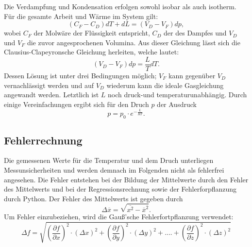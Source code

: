 Die Verdampfung und Kondensation erfolgen sowohl isobar als auch isotherm.
Für die gesamte Arbeit und Wärme im System gilt:
\begin{equation}
    (C_F-C_D)dT + dL = (V_D-V_F)dp,
\end{equation}
wobei $C_F$ der Molwäre der Flüssigkeit entspricht, $C_D$ der des Dampfes und 
$V_D$ und $V_F$ die zuvor angesprochenen Volumina. Aus dieser Gleichung lässt 
sich die Clausius-Clapeyronsche Gleichung herleiten, welche lautet:
\begin{equation}
    \label{eqn:2}
    (V_D-V_F)dp = \frac{L}{T}dT.
\end{equation}
Dessen Lösung ist unter drei Bedingungen möglich; $V_F$ kann gegenüber $V_D$
vernachlässigt werden und auf $V_D$ wiederum kann die ideale Gasgleichung
angewandt werden. Letztlich ist $L$ noch druck-und temperaturunabhängig.
Durch einige Vereinfachungen ergibt sich für den Druch $p$ der Ausdruck
\begin{equation}
    p = p_0 \cdot e^{-\frac{L}{RT}}.
\end{equation}

\subsection{Fehlerrechnung}
Die gemessenen Werte für die Temperatur und dem Druch unterliegen 
Messunsicherheiten und werden demnach im Folgenden nicht als fehlerfrei 
angesehen. Die Fehler entstehen bei der Bildung der Mittelwerte durch den 
Fehler des Mittelwerts und bei der Regressionsrechnung sowie der Fehlerforpflanzung 
durch Python. Der Fehler des Mittelwerts ist gegeben durch 
\begin{equation}
    \Delta \overline{x} = \sqrt{\overline{x^2} - \overline{x}^2}.
\end{equation}
Um Fehler einzubeziehen, wird die Gauß'sche Fehlerfortpflanzung verwendet:
\begin{equation}
    \Delta f = \sqrt{\left(\frac{\partial f}{\partial x}\right)^2 \cdot \left(\Delta x\right)^2 + \left(\frac{\partial f}{\partial y}\right)^2 \cdot \left(\Delta y\right)^2 + .... + \left(\frac{\partial f}{\partial z}\right)^2 \cdot \left(\Delta z\right)^2}
\end{equation}